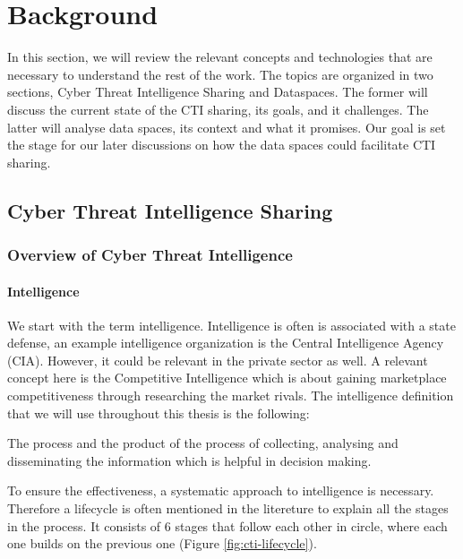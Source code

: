 \chapter{Background}
In this section, we will review the relevant concepts and technologies that are necessary to understand the rest of the work. The topics are organized in two sections, Cyber Threat Intelligence Sharing and Dataspaces. The former will discuss the current state of the CTI sharing, its goals, and it challenges. The latter will analyse data spaces, its context and what it promises. Our goal is set the stage for our later discussions on how the data spaces could facilitate CTI sharing. 

\section{Cyber Threat Intelligence Sharing}
\subsection{Overview of Cyber Threat Intelligence}

\subsubsection{Intelligence}
We start with the term intelligence. 
Intelligence is often is associated with a state defense, an example intelligence organization is the Central Intelligence Agency (CIA). 
However, it could be relevant in the private sector as well. 
A relevant concept here is the Competitive Intelligence which is about gaining marketplace competitiveness through researching the market rivals. The intelligence definition that we will use throughout this thesis is the following:

\smallskip
The process and the product of the process of collecting, analysing and disseminating the information which is helpful in decision making.

To ensure the effectiveness, a systematic approach to intelligence is necessary. Therefore a lifecycle is often mentioned in the litereture to explain all the stages in the process. It consists of 6 stages that follow each other in circle, where each one builds on the previous one (Figure \ref{fig:cti-lifecycle}).

